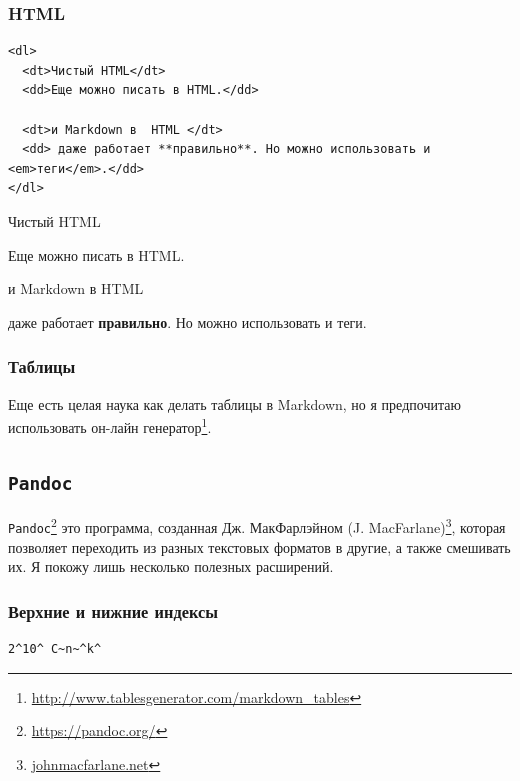 \documentclass[
]{book}
\renewcommand{\href}[2]{#2\footnote{\url{#1}}}
\begin{document}
\hypertarget{html}{%
\subsubsection{HTML}\label{html}}

\begin{verbatim}
<dl>
  <dt>Чистый HTML</dt>
  <dd>Еще можно писать в HTML.</dd>

  <dt>и Markdown в  HTML </dt>
  <dd> даже работает **правильно**. Но можно использовать и <em>теги</em>.</dd>
</dl>
\end{verbatim}

Чистый HTML

Еще можно писать в HTML.

и Markdown в HTML

даже работает \textbf{правильно}. Но можно использовать и теги.

\hypertarget{ux442ux430ux431ux43bux438ux446ux44b}{%
\subsubsection{Таблицы}\label{ux442ux430ux431ux43bux438ux446ux44b}}

Еще есть целая наука как делать таблицы в Markdown, но я предпочитаю использовать \href{http://www.tablesgenerator.com/markdown_tables}{он-лайн генератор}.

\hypertarget{pandoc}{%
\subsection{\texorpdfstring{\texttt{Pandoc}}{Pandoc}}\label{pandoc}}

\href{https://pandoc.org/}{\texttt{Pandoc}} это программа, созданная \href{johnmacfarlane.net}{Дж. МакФарлэйном (J. MacFarlane)}, которая позволяет переходить из разных текстовых форматов в другие, а также смешивать их. Я покожу лишь несколько полезных расширений.

\hypertarget{ux432ux435ux440ux445ux43dux438ux435-ux438-ux43dux438ux436ux43dux438ux435-ux438ux43dux434ux435ux43aux441ux44b}{%
\subsubsection{Верхние и нижние индексы}\label{ux432ux435ux440ux445ux43dux438ux435-ux438-ux43dux438ux436ux43dux438ux435-ux438ux43dux434ux435ux43aux441ux44b}}

\begin{verbatim}
2^10^ C~n~^k^
\end{verbatim}
\end{document}
